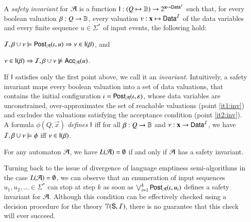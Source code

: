 \documentclass[10pt,conference,letterpaper,twocolumn]{IEEEtran}
\begin{document}
A \emph{safety invariant} for $\mathcal{A}$ is a function $\mathsf{I} : (Q \mapsto
\mathbb{B}) \rightarrow 2^{\mathbf x \mapsto \mathsf{Data}^{\mathcal{I}}}$ such that, for every
boolean valuation $\beta : Q \rightarrow \mathbb{B}$, every valuation $\nu
: \mathbf x \mapsto \mathsf{Data}^{\mathcal{I}}$ of the data variables and every finite
sequence $u \in \Sigma^*$ of input events, the following
hold: \begin{compactenum}
%
\item\label{it1:inv} $\mathcal{I},\beta \cup \nu \models \mathsf{Post}_{\mathcal{A}}(\iota,u)
  \Rightarrow \nu \in \mathsf{I}(\beta)$, and
%
\item\label{it2:inv} $\nu \in \mathsf{I}(\beta) \Rightarrow \mathcal{I},\beta \cup
  \nu \not\models \mathsf{Acc}_{\mathcal{A}}(u)$.
\end{compactenum}
If $\mathsf{I}$ satisfies only the first point above, we call it an
\emph{invariant}. Intuitively, a safety invariant maps every boolean
valuation into a set of data valuations, that contains the initial
configuration $\iota = \mathsf{Post}_{\mathcal{A}}(\iota,\varepsilon)$, whose data
variables are unconstrained, over-approximates the set of reachable
valuations (point \ref{it1:inv}) and excludes the valuations satisfying the
acceptance condition (point \ref{it2:inv}).  A formula $\phi(Q,\vec{x})$
\emph{defines} $\mathsf{I}$ iff for all $\beta: Q \rightarrow \mathbb{B}$ and
$\nu : \mathbf x \rightarrow \mathsf{Data}^{\mathcal{I}}$, we have $\mathcal{I},\beta\cup\nu \models
\phi$ iff $\nu \in \mathsf{I}(\beta)$.

\begin{lemma}\label{lemma:safety-invariant}
  For any automaton $\mathcal{A}$, we have $L(\mathcal{A}) = \emptyset$ if and only if
  $\mathcal{A}$ has a safety invariant.
\end{lemma}

Turning back to the issue of divergence of language emptiness
semi-algorithms in the case $L(\mathcal{A}) = \emptyset$, we can observe that
an enumeration of input sequences $u_1,u_2,\ldots \in \Sigma^*$ can
stop at step $k$ as soon as $\bigvee_{i=1}^k \mathsf{Post}_{\mathcal{A}}(\iota,u_i)$
defines a safety invariant for $\mathcal{A}$. Although this condition can be
effectively checked using a decision procedure for the theory
$\mathbb{T}(\mathsf{S},\mathcal{I})$, there is no guarantee that this check will ever
succeed.
\end{document}
